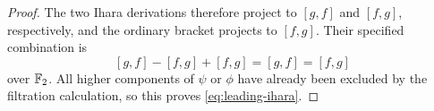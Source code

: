 \begin{proof}
The two Ihara derivations therefore project to $[g,f]$ and
$[f,g]$, respectively, and the ordinary bracket projects to
$[f,g]$.  Their specified combination is
\[
 [g,f]-[f,g]+[f,g]=[g,f]=[f,g]
\]
over ${\mathbb F_2}$.
All higher components of $\psi$ or $\phi$ have already been
excluded by the filtration calculation, so this proves
\eqref{eq:leading-ihara}.
\end{proof}

